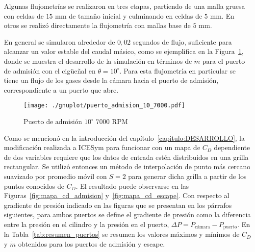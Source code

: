 Algunas flujometrías se realizaron en tres etapas, partiendo de una malla gruesa
con celdas de $15$ mm de tamaño inicial y culminando en celdas de $5$ mm.
%
En otros se realizó directamente la flujometría con mallas base de $5$ mm.

En general se simularon alrededor de $0,02$ segundos de flujo, suficiente para
alcanzar un valor estable del caudal másico, como se ejemplifica en la
Figura~\ref{fig:adm_10_7000rpm}, donde se muestra el desarrollo de la simulación
en términos de $\dot{m}$ para el puerto de admisión con el cigüeñal en
$\theta=10^{\circ}$.
%
Para esta flujometría en particular se tiene un flujo de los gases desde la
cámara hacia el puerto de admisión, correspondiente a un puerto que abre.

%
%

\begin{figure}[h!]
  \centering
  \texttt{[image: ./gnuplot/puerto\_admision\_10\_7000.pdf]}
  \caption{Puerto de admisión $10^{\circ}$ \@ $7000$ RPM}\label{fig:adm_10_7000rpm}
\end{figure}

Como se mencionó en la introducción del capítulo~\ref{capitulo:DESARROLLO}, la
modificación realizada a ICESym para funcionar con un mapa de $C_{D}$
dependiente de dos variables requiere que los datos de entrada estén
distribuidos en una grilla rectangular.
%
Se utilizó entonces un método de interpolación de punto más cercano suavizado
por promedio móvil con $S=2$ para generar dicha grilla a partir de los puntos
conocidos de $C_{D}$.
%
El resultado puede observarse en las Figuras~\ref{fig:mapa_cd_admision}
y~\ref{fig:mapa_cd_escape}.
%
Con respecto al gradiente de presión indicado en las figuras que se presentan en
los párrafos siguientes, para ambos puertos se define el gradiente de presión
como la diferencia entre la presión en el cilindro y la presión en el puerto,
$\Delta P = P_{\text{c\'amara}} - P_{\text{puerto}}$.
%
En la Tabla~\ref{tab:resumen_puertos} se resumen los valores máximos y mínimos
de $C_{D}$ y $\dot{m}$ obtenidos para los puertos de admisión y escape.

